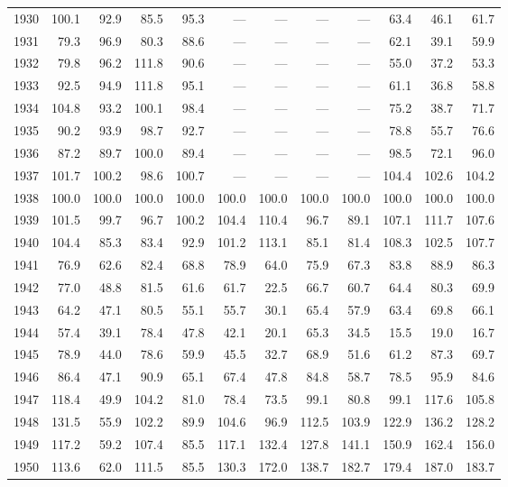\begin{longtable}{rrrrrrrrrrrr}
1930 & 100.1 & 92.9 & 85.5 & 95.3 & --- & --- & --- & --- & 63.4 & 46.1 & 61.7 \\
1931 & 79.3 & 96.9 & 80.3 & 88.6 & --- & --- & --- & --- & 62.1 & 39.1 & 59.9 \\
1932 & 79.8 & 96.2 & 111.8 & 90.6 & --- & --- & --- & --- & 55.0 & 37.2 & 53.3 \\
1933 & 92.5 & 94.9 & 111.8 & 95.1 & --- & --- & --- & --- & 61.1 & 36.8 & 58.8 \\
1934 & 104.8 & 93.2 & 100.1 & 98.4 & --- & --- & --- & --- & 75.2 & 38.7 & 71.7 \\
1935 & 90.2 & 93.9 & 98.7 & 92.7 & --- & --- & --- & --- & 78.8 & 55.7 & 76.6 \\
1936 & 87.2 & 89.7 & 100.0 & 89.4 & --- & --- & --- & --- & 98.5 & 72.1 & 96.0 \\
1937 & 101.7 & 100.2 & 98.6 & 100.7 & --- & --- & --- & --- & 104.4 & 102.6 & 104.2 \\
1938 & 100.0 & 100.0 & 100.0 & 100.0 & 100.0 & 100.0 & 100.0 & 100.0 & 100.0 & 100.0 & 100.0 \\
1939 & 101.5 & 99.7 & 96.7 & 100.2 & 104.4 & 110.4 & 96.7 & 89.1 & 107.1 & 111.7 & 107.6 \\
1940 & 104.4 & 85.3 & 83.4 & 92.9 & 101.2 & 113.1 & 85.1 & 81.4 & 108.3 & 102.5 & 107.7 \\
1941 & 76.9 & 62.6 & 82.4 & 68.8 & 78.9 & 64.0 & 75.9 & 67.3 & 83.8 & 88.9 & 86.3 \\
1942 & 77.0 & 48.8 & 81.5 & 61.6 & 61.7 & 22.5 & 66.7 & 60.7 & 64.4 & 80.3 & 69.9 \\
1943 & 64.2 & 47.1 & 80.5 & 55.1 & 55.7 & 30.1 & 65.4 & 57.9 & 63.4 & 69.8 & 66.1 \\
1944 & 57.4 & 39.1 & 78.4 & 47.8 & 42.1 & 20.1 & 65.3 & 34.5 & 15.5 & 19.0 & 16.7 \\
1945 & 78.9 & 44.0 & 78.6 & 59.9 & 45.5 & 32.7 & 68.9 & 51.6 & 61.2 & 87.3 & 69.7 \\
1946 & 86.4 & 47.1 & 90.9 & 65.1 & 67.4 & 47.8 & 84.8 & 58.7 & 78.5 & 95.9 & 84.6 \\
1947 & 118.4 & 49.9 & 104.2 & 81.0 & 78.4 & 73.5 & 99.1 & 80.8 & 99.1 & 117.6 & 105.8 \\
1948 & 131.5 & 55.9 & 102.2 & 89.9 & 104.6 & 96.9 & 112.5 & 103.9 & 122.9 & 136.2 & 128.2 \\
1949 & 117.2 & 59.2 & 107.4 & 85.5 & 117.1 & 132.4 & 127.8 & 141.1 & 150.9 & 162.4 & 156.0 \\
1950 & 113.6 & 62.0 & 111.5 & 85.5 & 130.3 & 172.0 & 138.7 & 182.7 & 179.4 & 187.0 & 183.7 \\

\end{longtable}
